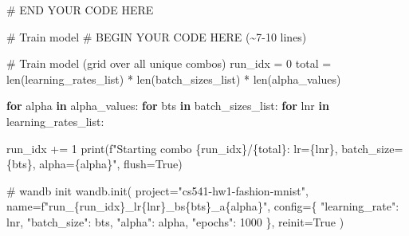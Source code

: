 \documentclass[
  letterpaper,
  DIV=11,
  numbers=noendperiod]{scrartcl}
\newenvironment{Shaded}{\begin{snugshade}}{\end{snugshade}}
\newcommand{\BuiltInTok}[1]{\textcolor[rgb]{0.00,0.23,0.31}{#1}}
\newcommand{\CommentTok}[1]{\textcolor[rgb]{0.37,0.37,0.37}{#1}}
\newcommand{\ControlFlowTok}[1]{\textcolor[rgb]{0.00,0.23,0.31}{\textbf{#1}}}
\newcommand{\DecValTok}[1]{\textcolor[rgb]{0.68,0.00,0.00}{#1}}
\newcommand{\KeywordTok}[1]{\textcolor[rgb]{0.00,0.23,0.31}{\textbf{#1}}}
\newcommand{\NormalTok}[1]{\textcolor[rgb]{0.00,0.23,0.31}{#1}}
\newcommand{\OperatorTok}[1]{\textcolor[rgb]{0.37,0.37,0.37}{#1}}
\newcommand{\RegionMarkerTok}[1]{\textcolor[rgb]{0.00,0.23,0.31}{#1}}
\newcommand{\SpecialCharTok}[1]{\textcolor[rgb]{0.37,0.37,0.37}{#1}}
\newcommand{\SpecialStringTok}[1]{\textcolor[rgb]{0.13,0.47,0.30}{#1}}
\newcommand{\StringTok}[1]{\textcolor[rgb]{0.13,0.47,0.30}{#1}}
\newcommand{\VariableTok}[1]{\textcolor[rgb]{0.07,0.07,0.07}{#1}}
\begin{document}
\begin{Shaded}
\begin{Highlighting}[]
    \CommentTok{\# }\RegionMarkerTok{END}\CommentTok{ YOUR CODE HERE}

    \CommentTok{\# Train model}
    \CommentTok{\# }\RegionMarkerTok{BEGIN}\CommentTok{ YOUR CODE HERE (\textasciitilde{}7{-}10 lines)}

    \CommentTok{\# Train model (grid over all unique combos)}
\NormalTok{    run\_idx }\OperatorTok{=} \DecValTok{0}
\NormalTok{    total }\OperatorTok{=} \BuiltInTok{len}\NormalTok{(learning\_rates\_list) }\OperatorTok{*} \BuiltInTok{len}\NormalTok{(batch\_sizes\_list) }\OperatorTok{*} \BuiltInTok{len}\NormalTok{(alpha\_values)}
    
    \ControlFlowTok{for}\NormalTok{ alpha }\KeywordTok{in}\NormalTok{ alpha\_values:}
        \ControlFlowTok{for}\NormalTok{ bts }\KeywordTok{in}\NormalTok{ batch\_sizes\_list:}
            \ControlFlowTok{for}\NormalTok{ lnr }\KeywordTok{in}\NormalTok{ learning\_rates\_list:}

\NormalTok{                run\_idx }\OperatorTok{+=} \DecValTok{1}
                \BuiltInTok{print}\NormalTok{(}\SpecialStringTok{f"Starting combo }\SpecialCharTok{\{}\NormalTok{run\_idx}\SpecialCharTok{\}}\SpecialStringTok{/}\SpecialCharTok{\{}\NormalTok{total}\SpecialCharTok{\}}\SpecialStringTok{: lr=}\SpecialCharTok{\{}\NormalTok{lnr}\SpecialCharTok{\}}\SpecialStringTok{, batch\_size=}\SpecialCharTok{\{}\NormalTok{bts}\SpecialCharTok{\}}\SpecialStringTok{, alpha=}\SpecialCharTok{\{}\NormalTok{alpha}\SpecialCharTok{\}}\SpecialStringTok{"}\NormalTok{, flush}\OperatorTok{=}\VariableTok{True}\NormalTok{)}
                
                \CommentTok{\# wandb init}
\NormalTok{                wandb.init(}
\NormalTok{                    project}\OperatorTok{=}\StringTok{"cs541{-}hw1{-}fashion{-}mnist"}\NormalTok{,}
\NormalTok{                    name}\OperatorTok{=}\SpecialStringTok{f"run\_}\SpecialCharTok{\{}\NormalTok{run\_idx}\SpecialCharTok{\}}\SpecialStringTok{\_lr}\SpecialCharTok{\{}\NormalTok{lnr}\SpecialCharTok{\}}\SpecialStringTok{\_bs}\SpecialCharTok{\{}\NormalTok{bts}\SpecialCharTok{\}}\SpecialStringTok{\_a}\SpecialCharTok{\{}\NormalTok{alpha}\SpecialCharTok{\}}\SpecialStringTok{"}\NormalTok{,}
\NormalTok{                    config}\OperatorTok{=}\NormalTok{\{}
                        \StringTok{"learning\_rate"}\NormalTok{: lnr,}
                        \StringTok{"batch\_size"}\NormalTok{: bts,}
                        \StringTok{"alpha"}\NormalTok{: alpha,}
                        \StringTok{"epochs"}\NormalTok{: }\DecValTok{1000}
\NormalTok{                    \},}
\NormalTok{                    reinit}\OperatorTok{=}\VariableTok{True}
\NormalTok{                )}


\end{Highlighting}
\end{Shaded}
\end{document}
